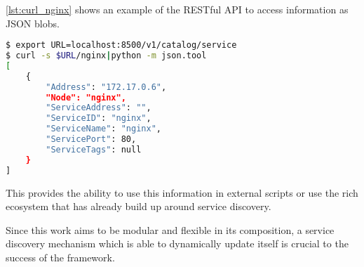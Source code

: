 \autoref{lst:curl_nginx} shows an example of the RESTful API to access information as JSON blobs.

\begin{lstlisting}[language=bash,
    caption={Exposure of services via RESTful API.},
    label={lst:curl_nginx}]
$ export URL=localhost:8500/v1/catalog/service
$ curl -s $URL/nginx|python -m json.tool
[
    {
        "Address": "172.17.0.6",
        "Node": "nginx",
        "ServiceAddress": "",
        "ServiceID": "nginx",
        "ServiceName": "nginx",
        "ServicePort": 80,
        "ServiceTags": null
    }
]
\end{lstlisting}
This provides the ability to use this information in external scripts or use the rich ecosystem that has already build up around service discovery.

Since this work aims to be modular and flexible in its composition, a service discovery mechanism which is able to dynamically update itself is crucial to the success of the framework.
